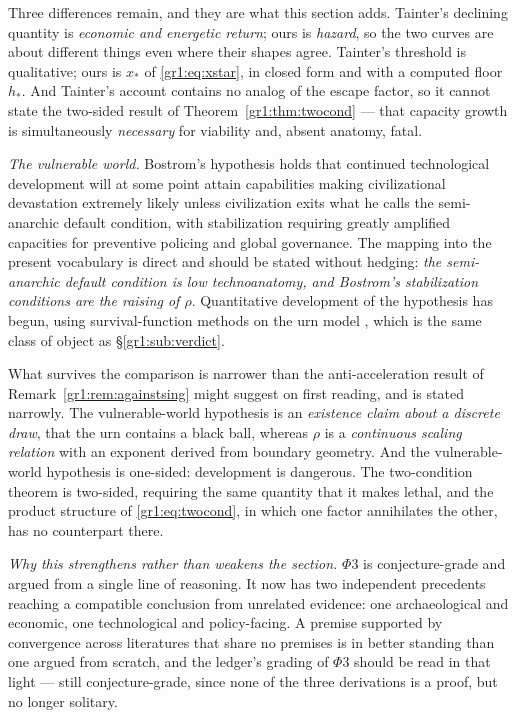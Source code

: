 \documentclass[11pt]{article}
\numberwithin{equation}{section}
\theoremstyle{plain}
\theoremstyle{definition}
\theoremstyle{remark}
\begin{document}
Three differences remain, and they are what this section adds. Tainter's
declining quantity is \emph{economic and energetic return}; ours is
\emph{hazard}, so the two curves are about different things even where
their shapes agree. Tainter's threshold is qualitative; ours is
$x_\ast$ of \eqref{gr1:eq:xstar}, in closed form and with a computed
floor $h_\ast$. And Tainter's account contains no analog of the
escape factor, so it cannot state the two-sided result of
Theorem~\ref{gr1:thm:twocond} --- that capacity growth is simultaneously
\emph{necessary} for viability and, absent anatomy, fatal.

\emph{The vulnerable world.} Bostrom's hypothesis \cite{Bostrom19} holds
that continued technological development will at some point attain
capabilities making civilizational devastation extremely likely unless
civilization exits what he calls the semi-anarchic default condition,
with stabilization requiring greatly amplified capacities for preventive
policing and global governance. The mapping into the present vocabulary
is direct and should be stated without hedging: \emph{the semi-anarchic
default condition is low technoanatomy, and Bostrom's stabilization
conditions are the raising of $\rho$}. Quantitative development of the
hypothesis has begun, using survival-function methods on the urn model
\cite{EF24}, which is the same class of object as
\S\ref{gr1:sub:verdict}.

What survives the comparison is narrower than the anti-acceleration
result of Remark~\ref{gr1:rem:againstsing} might suggest on first
reading, and is stated narrowly. The vulnerable-world hypothesis is an
\emph{existence claim about a discrete draw}, that the urn contains a
black ball, whereas $\rho$ is a \emph{continuous scaling relation}
with an exponent derived from boundary geometry. And the vulnerable-world
hypothesis is one-sided: development is dangerous. The two-condition
theorem is two-sided, requiring the same quantity that it makes lethal,
and the product structure of \eqref{gr1:eq:twocond}, in which one
factor annihilates the other, has no counterpart there.

\emph{Why this strengthens rather than weakens the section.} $\Phi3$ is
conjecture-grade and argued from a single line of reasoning. It now has
two independent precedents reaching a compatible conclusion from
unrelated evidence: one archaeological and economic, one
technological and policy-facing. A premise supported by convergence
across literatures that share no premises is in better standing than one
argued from scratch, and the ledger's grading of $\Phi3$ should be read
in that light --- still conjecture-grade, since none of the three
derivations is a proof, but no longer solitary.
\end{document}
